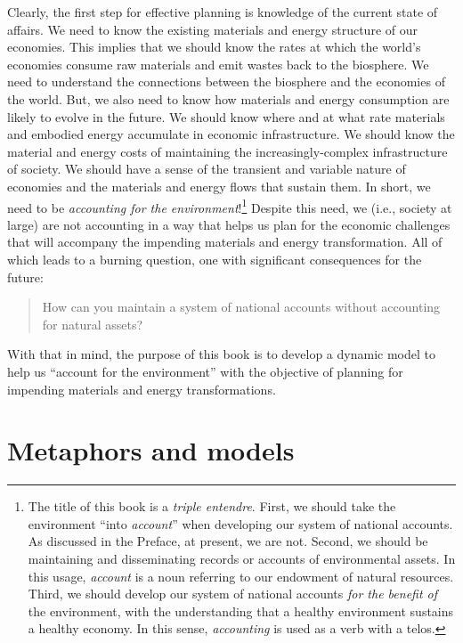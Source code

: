 Clearly, the first step for effective planning 
is knowledge of the current state of affairs.
We need to know the existing materials and energy structure of our economies. 
This implies that we should know the rates at which 
the world's economies consume raw materials and emit wastes back to the biosphere.
We need to understand the connections between the biosphere and the economies of the world.
But, we also need to know how materials and energy consumption 
are likely to evolve in the future.
We should know where and at what rate 
materials and embodied energy accumulate 
in economic infrastructure. 
We should know the material and energy costs of maintaining the
increasingly-complex infrastructure of society.
We should have a sense of the transient and variable nature of economies
and the materials and energy flows that sustain them.
In short, we need to be \emph{accounting for the environment}!\footnote{The title 
	of this book is a \emph{triple entendre}.
	First, we should take the environment ``into \emph{account}''
		when developing our system of national accounts.
		As discussed in the Preface, at present, we are not.
	Second, we should be maintaining and disseminating
		records or accounts of environmental assets. 
		In this usage, \emph{account} is a noun
		referring to our endowment of natural resources.
	Third, we should develop our system of national accounts 
		\emph{for the benefit of} the environment, 
		with the understanding 
		that a healthy environment sustains a healthy economy.
		In this sense, \emph{accounting} is used as a verb with a telos.
}
Despite this need, we (i.e., society at large) 
are not accounting in a way that helps us plan 
for the economic challenges that will accompany 
the impending materials and energy transformation.
All of which leads to a burning question,
one with significant consequences for the future:

\begin{quote}
{\normalsize{How can you maintain a system of national accounts without 
accounting for natural assets?}}
\end{quote}

\noindent{}With that in mind, the purpose of this book is to 
develop a dynamic model to help us
``account for the environment''
with the objective of planning for impending materials and energy transformations.

\section{Metaphors and models}
\label{sec:metaphors_and_models}

